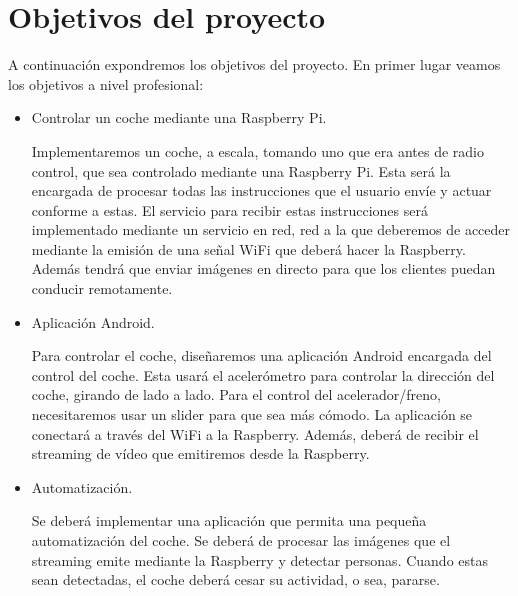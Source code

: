 \documentclass{pclass}
\begin{document}
\section{Objetivos del proyecto}

A continuación expondremos los objetivos del proyecto. En primer lugar veamos los objetivos a nivel profesional:
\begin{itemize}
	\item Controlar un coche mediante una Raspberry Pi. 
	
	Implementaremos un coche, a escala, tomando uno que era antes de radio control, que sea controlado mediante una Raspberry Pi. Esta será la encargada de procesar todas las instrucciones que el usuario envíe y actuar conforme a estas. El servicio para recibir estas instrucciones será implementado mediante un servicio en red, red a la que deberemos de acceder mediante la emisión de una señal WiFi que deberá hacer la Raspberry. Además tendrá que enviar imágenes en directo para que los clientes puedan conducir remotamente.
	
	\item Aplicación Android. 
	
	Para controlar el coche, diseñaremos una aplicación Android encargada del control del coche. Esta usará el acelerómetro para controlar la dirección del coche, girando de lado a lado. Para el control del acelerador/freno, necesitaremos usar un slider para que sea más cómodo. La aplicación se conectará a través del WiFi a la Raspberry. Además, deberá de recibir el streaming de vídeo que emitiremos desde la Raspberry.
	
	\item Automatización. 
	
	Se deberá implementar una aplicación que permita una pequeña automatización del coche. Se deberá de procesar las imágenes que el streaming emite mediante la Raspberry y detectar personas. Cuando estas sean detectadas, el coche deberá cesar su actividad, o sea, pararse.
\end{itemize}
\end{document}
